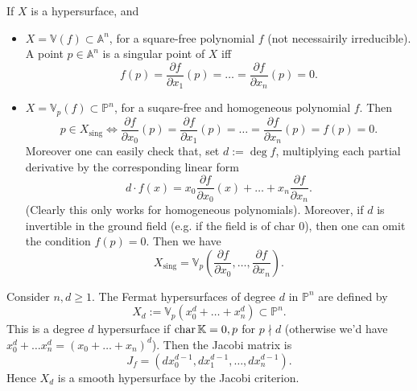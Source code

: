 \begin{rem}[]
	If $X$ is a hypersurface, and
	\begin{itemize}
		\item $X = \mathbb{V}\left( f \right) \subset \mathbb{A}^{n}$, for a square-free polynomial $f$
			(not necessairily irreducible).
			A point $p \in \mathbb{A}^{n}$ is a singular point of $X$ iff
			\begin{equation}
				f(p) = \frac{\partial f}{\partial x_1} (p) = \ldots
				= \frac{\partial f}{\partial x_n} (p) = 0
			.\end{equation} 
		\item $X = \mathbb{V}_p\left( f \right) \subset \mathbb{P}^{n}$, for a suqare-free 
			and homogeneous polynomial $f$. Then
			\begin{equation}
			p \in X_{\text{sing}} \iff
			\frac{\partial f}{\partial x_0} (p) = \frac{\partial f}{\partial x_1} (p) =
			\ldots = \frac{\partial f}{\partial x_n} (p) = f(p) = 0
			.\end{equation} 
			Moreover one can easily check that, set $d := \deg f$,
			multiplying each partial derivative by the corresponding linear form
			\begin{equation}
				d \cdot f (x) = 
				x_0 \frac{\partial f}{\partial x_0} (x) + \ldots +
				x_n \frac{\partial f}{\partial x_n}
			.\end{equation} 
			(Clearly this only works for homogeneous polynomials).
			Moreover, if $d$ is invertible in the ground field (e.g.
			if the field is of char $0$), then one can omit the condition $f(p) = 0$.
			Then we have
			\begin{equation}
			X_{\text{sing}} = \mathbb{V}_p\left( \frac{\partial f}{\partial x_0}, \ldots,
			\frac{\partial f}{\partial x_n} \right)
			.\end{equation} 
	\end{itemize}
\end{rem}

\begin{ex}
	Consider $n,d \geq 1$. The Fermat hypersurfaces of degree $d$ in $\mathbb{P}^{n}$ are defined by
	\begin{equation}
	X_d := \mathbb{V}_p\left( x_0^d + \ldots + x_n^d \right) \subset \mathbb{P}^{n}
	.\end{equation} 
	This is a degree $d$ hypersurface if $\mathrm{char}\, \mathbb{K} = 0, p$ for $p \nmid d$
	(otherwise we'd have $x_0^d + \ldots x_n^d = \left( x_0 + \ldots + x_n \right)^d$).
	Then the Jacobi matrix is
	\begin{equation}
		J_f = \left( d x_0^{d-1}, d x_1^{d-1}, \ldots, d x_n^{d-1} \right)
	.\end{equation} 
	Hence $X_d$ is a smooth hypersurface by the Jacobi criterion.
\end{ex}  

